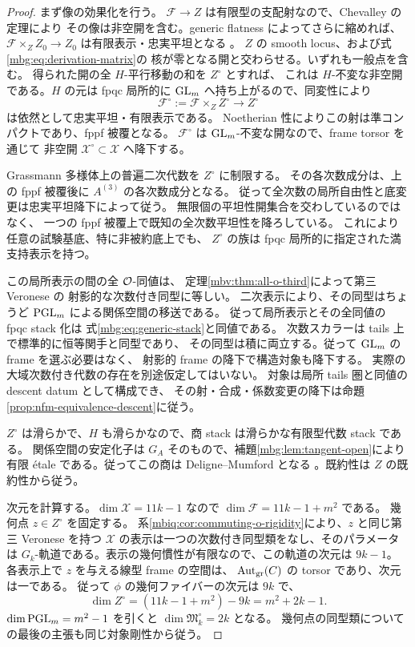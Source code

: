 \begin{proof}
まず像の効果化を行う。
$\mathcal F\to Z$ は有限型の支配射なので、Chevalley の定理により
その像は非空開を含む。generic flatness によってさらに縮めれば、
$\mathcal F\times_Z Z_0\to Z_0$ は有限表示・忠実平坦となる
\cite[Tags~054K and~052A]{MBGStacks}。
$Z$ の smooth locus、および式\eqref{mbg:eq:derivation-matrix}の
核が零となる開と交わらせる。いずれも一般点を含む。
得られた開の全 $H$-平行移動の和を $Z^\circ$ とすれば、
これは $H$-不変な非空開である。$H$ の元は fpqc 局所的に $\operatorname{GL}_m$ へ持ち上がるので、同変性により
\[
 \mathcal F^\circ:=\mathcal F\times_Z Z^\circ\longrightarrow Z^\circ
\]
は依然として忠実平坦・有限表示である。
Noetherian 性によりこの射は準コンパクトであり、fppf 被覆となる。
$\mathcal F^\circ$ は $\operatorname{GL}_m$-不変な開なので、frame torsor を通じて
非空開 $\mathcal X^\circ\subset\mathcal X$ へ降下する。

Grassmann 多様体上の普遍二次代数を $Z^\circ$ に制限する。
その各次数成分は、上の fppf 被覆後に $A^{(3)}$ の各次数成分となる。
従って全次数の局所自由性と底変更は忠実平坦降下によって従う。
無限個の平坦性開集合を交わしているのではなく、
一つの fppf 被覆上で既知の全次数平坦性を降ろしている。
これにより任意の試験基底、特に非被約底上でも、
$Z^\circ$ の族は fpqc 局所的に指定された満支持表示を持つ。

この局所表示の間の全 $\mathcal O$-同値は、
定理\ref{mbv:thm:all-o-third}によって第三 Veronese の
射影的な次数付き同型に等しい。
二次表示により、その同型はちょうど $\operatorname{PGL}_m$ による関係空間の移送である。
従って局所表示とその全同値の fpqc stack 化は
式\eqref{mbg:eq:generic-stack}と同値である。
次数スカラーは tails 上で標準的に恒等関手と同型であり、
その同型は積に両立する。従って $\operatorname{GL}_m$ の frame を選ぶ必要はなく、
射影的 frame の降下で構造対象も降下する。
実際の大域次数付き代数の存在を別途仮定してはいない。
対象は局所 tails 圏と同値の descent datum として構成でき、
その射・合成・係数変更の降下は命題\ref{prop:nfm-equivalence-descent}に従う。

$Z^\circ$ は滑らかで、$H$ も滑らかなので、商 stack は滑らかな有限型代数 stack である。
関係空間の安定化子は $G_A$ そのもので、補題\ref{mbg:lem:tangent-open}により
有限 \'etale である。従ってこの商は Deligne--Mumford となる
\cite[Tag~0DSL]{MBGStacks}。既約性は $Z$ の既約性から従う。

次元を計算する。$\dim\mathcal X=11k-1$ なので
$\dim\mathcal F=11k-1+m^2$ である。
幾何点 $z\in Z^\circ$ を固定する。
系\ref{mbiq:cor:commuting-o-rigidity}により、$z$ と同じ第三 Veronese を持つ
$\mathcal X$ の表示は一つの次数付き同型類をなし、そのパラメータは
$G_k$-軌道である。表示の幾何慣性が有限なので、この軌道の次元は $9k-1$。
各表示上で $z$ を与える線型 frame の空間は、
$\operatorname{Aut}_{\mathrm{gr}}(C)$ の torsor であり、次元は一である。
従って $\phi$ の幾何ファイバーの次元は $9k$ で、
\[
 \dim Z^\circ=(11k-1+m^2)-9k=m^2+2k-1.
\]
$\dim\operatorname{PGL}_m=m^2-1$ を引くと $\dim\mathfrak M_k^\circ=2k$ となる。
幾何点の同型類についての最後の主張も同じ対象剛性から従う。
\end{proof}

